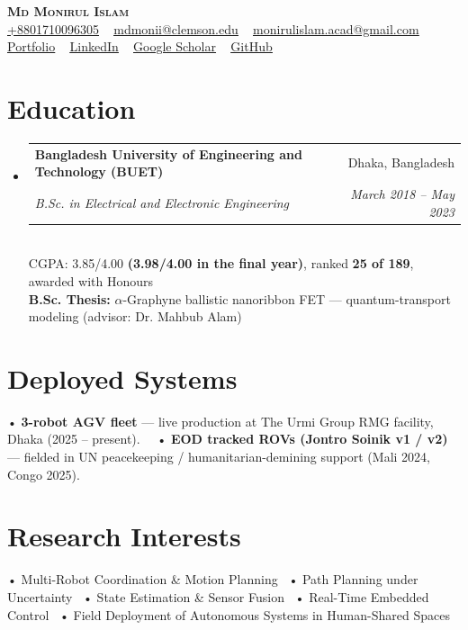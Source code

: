 \documentclass[a4paper,20pt]{article}
\makeatletter
\newcommand{\resumeSubheading}[4]{
  \vspace{-1pt}\item
    \begin{tabular*}{0.97\textwidth}{l@{\extracolsep{\fill}}r}
      \textbf{#1} & #2 \\
      \textit{#3} & \textit{#4} \\
    \end{tabular*}\vspace{-5pt}
}
\newcommand{\resumeSubHeadingListStart}{\begin{itemize}[leftmargin=*]}
\newcommand{\resumeSubHeadingListEnd}{\end{itemize}}
\makeatother
\begin{document}
\begin{center}
    {\Huge \scshape \textbf{Md Monirul Islam}} \\ \vspace{2pt}
    \small
    \href{tel:8801710096305}{\underline{+8801710096305}}
    ~ \href{mailto:mdmonii@clemson.edu}{\underline{mdmonii@clemson.edu}}
    ~ \href{mailto:monirulislam.acad@gmail.com}{\underline{monirulislam.acad@gmail.com}}
    ~ \href{https://Monirul305.github.io}{\underline{Portfolio}}
    ~ \href{https://www.linkedin.com/in/monirul-islam-460001148/}{\underline{LinkedIn}}
    ~ \href{https://scholar.google.com/citations?user=m-6T5FgAAAAJ&hl=en}{\underline{Google Scholar}}
    ~ \href{https://github.com/Monirul305}{\underline{GitHub}}
\end{center}

\section{\textbf{Education}}
  \resumeSubHeadingListStart
    \resumeSubheading
      {Bangladesh University of Engineering and Technology (BUET)}{Dhaka, Bangladesh}
      {B.Sc. in Electrical and Electronic Engineering}{March 2018 -- May 2023}{{}}\\ \vspace{4pt} {CGPA: 3.85/4.00 \textbf{(3.98/4.00 in the final year)}, ranked \textbf{25 of 189}, awarded with Honours \\ \vspace{3pt} \textbf{B.Sc. Thesis:} \(\alpha\)-Graphyne ballistic nanoribbon FET --- quantum-transport modeling (advisor: Dr. Mahbub Alam)}
      {}
    \resumeSubHeadingListEnd

\section{\textbf{Deployed Systems}}
• \textbf{3-robot AGV fleet} --- live production at The Urmi Group RMG facility, Dhaka (2025 -- present).~~ • \textbf{EOD tracked ROVs (Jontro Soinik v1 / v2)} --- fielded in UN peacekeeping / humanitarian-demining support (Mali 2024, Congo 2025).

\vspace{4pt}
\section{\textbf{Research Interests}}
• Multi-Robot Coordination \& Motion Planning~ • Path Planning under Uncertainty~ • State Estimation \& Sensor Fusion~ • Real-Time Embedded Control~ • Field Deployment of Autonomous Systems in Human-Shared Spaces
\end{document}
